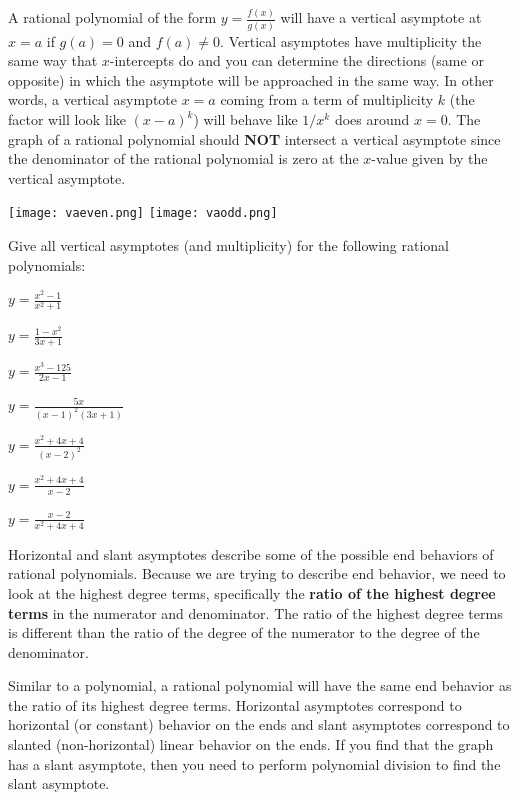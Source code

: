 \begin{info}
A rational polynomial of the form $y =\frac{f(x)}{g(x)}$ will have a vertical asymptote at $x=a$ if $g(a)=0$ and $f(a) \neq 0$. Vertical asymptotes have multiplicity the same way that $x$-intercepts do and you can determine the directions (same or opposite) in which the asymptote will be approached in the same way. In other words, a vertical asymptote $x=a$ coming from a term of multiplicity $k$ (the factor will look like $(x-a)^k$) will behave like $1/x^k$ does around $x=0$. The graph of a rational polynomial should \textbf{NOT} intersect a vertical asymptote since the denominator of the rational polynomial is zero at the $x$-value given by the vertical asymptote.

\begin{center} \texttt{[image: vaeven.png]} \texttt{[image: vaodd.png]} \end{center}
\end{info}
\bq Give all vertical asymptotes (and multiplicity) for the following rational polynomials:
\be
\item $y=\frac{x^2-1}{x^2+1}$
\item $y=\frac{1-x^2}{3x+1}$
\item $y=\frac{x^3-125}{2x-1}$
\item $y=\frac{5x}{(x-1)^2(3x+1)}$
\item $y=\frac{x^2+4x+4}{(x-2)^2}$
\item $y=\frac{x^2+4x+4}{x-2}$
\item $y=\frac{x-2}{x^2+4x+4}$
\ee
\eq

\begin{info}
Horizontal and slant asymptotes describe some of the possible end behaviors of rational polynomials. Because we are trying to describe end behavior, we need to look at the highest degree terms, specifically the \textbf{ratio of the highest degree terms} in the numerator and denominator. The ratio of the highest degree terms is different than the ratio of the degree of the numerator to the degree of the denominator.

Similar to a polynomial, a rational polynomial will have the same end behavior as the ratio of its highest degree terms. Horizontal asymptotes correspond to horizontal (or constant) behavior on the ends and slant asymptotes correspond to slanted (non-horizontal) linear behavior on the ends. If you find that the graph has a slant asymptote, then you need to perform polynomial division to find the slant asymptote.
\end{info}

